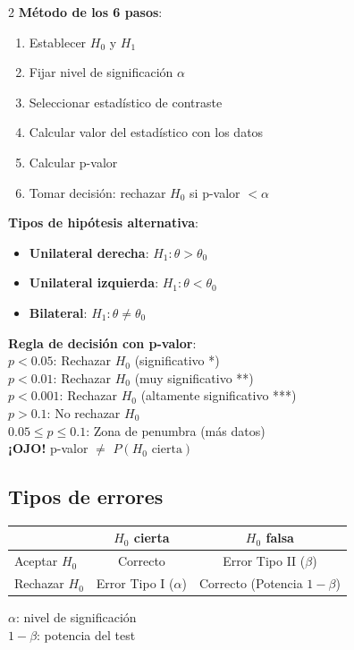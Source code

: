 \documentclass[9pt,a4paper]{article}
\begin{document}
\begin{multicols}{2}
\textbf{Método de los 6 pasos}:
\begin{enumerate}[leftmargin=*]
\item Establecer $H_0$ y $H_1$
\item Fijar nivel de significación $\alpha$
\item Seleccionar estadístico de contraste
\item Calcular valor del estadístico con los datos
\item Calcular p-valor
\item Tomar decisión: rechazar $H_0$ si p-valor $<\alpha$
\end{enumerate}

\textbf{Tipos de hipótesis alternativa}:
\begin{itemize}[leftmargin=*]
\item \textbf{Unilateral derecha}: $H_1:\theta>\theta_0$
\item \textbf{Unilateral izquierda}: $H_1:\theta<\theta_0$
\item \textbf{Bilateral}: $H_1:\theta\neq\theta_0$
\end{itemize}

\begin{alertbox}
\textbf{Regla de decisión con p-valor}:\\
$p<0.05$: Rechazar $H_0$ (significativo *)\\
$p<0.01$: Rechazar $H_0$ (muy significativo **)\\
$p<0.001$: Rechazar $H_0$ (altamente significativo ***)\\
$p>0.1$: No rechazar $H_0$\\
$0.05\leq p\leq 0.1$: Zona de penumbra (más datos)\\[3pt]
\textbf{¡OJO!} p-valor $\neq$ $P(H_0\text{ cierta})$
\end{alertbox}

\subsection{Tipos de errores}
\begin{center}
\begin{tabular}{@{}l|cc@{}}
& $H_0$ cierta & $H_0$ falsa\\
\hline
Aceptar $H_0$ & Correcto & Error Tipo II ($\beta$)\\
Rechazar $H_0$ & Error Tipo I ($\alpha$) & Correcto (Potencia $1-\beta$)
\end{tabular}
\end{center}
$\alpha$: nivel de significación\\
$1-\beta$: potencia del test


\end{multicols}
\end{document}
